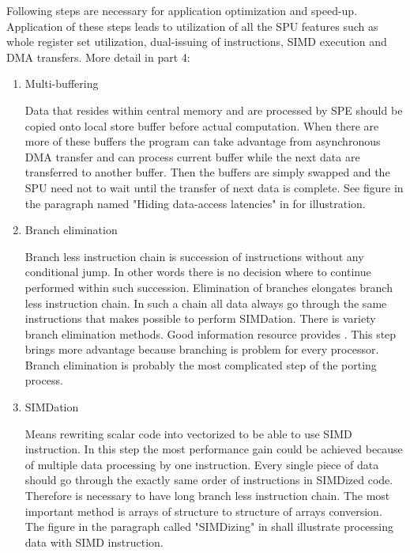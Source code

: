 \par
Following steps are necessary for application optimization and speed-up.
Application of these steps leads to utilization of all the SPU features such as whole register set utilization, dual-issuing of instructions, SIMD execution and DMA transfers.
More detail in \cite{writingPerfApps} part 4:
\\
\begin{enumerate}
\item{Multi-buffering}
\par
Data that resides within central memory and are processed by SPE should be copied onto local store buffer before actual computation.
When there are more of these buffers the program can take advantage from asynchronous DMA transfer and can process current buffer while the next data are transferred to another buffer.
Then the buffers are simply swapped and the SPU need not to wait until the transfer of next data is complete.
See figure in the paragraph named "Hiding data-access latencies" in \cite{compilerOptions} for illustration.

\item{Branch elimination}
\par
Branch less instruction chain is succession of instructions without any conditional jump.
In other words there is no decision where to continue performed within such succession.
Elimination of branches elongates branch less instruction chain.
In such a chain all data always go through the same instructions that makes possible to perform SIMDation.
There is variety branch elimination methods.
Good information resource provides \cite{cellPerformance}.
This step brings more advantage because branching is problem for every processor.
Branch elimination is probably the most complicated step of the porting process.

\item{SIMDation}
\par
Means rewriting scalar code into vectorized to be able to use SIMD instruction.
In this step the most performance gain could be achieved because of multiple data processing by one instruction.
Every single piece of data should go through the exactly same order of instructions in SIMDized code.
Therefore is necessary to have long branch less instruction chain.
The most important method is arrays of structure to structure of arrays conversion.
The figure in the paragraph called "SIMDizing" in \cite{compilerOptions} shall illustrate processing data with SIMD instruction.


\end{enumerate}
